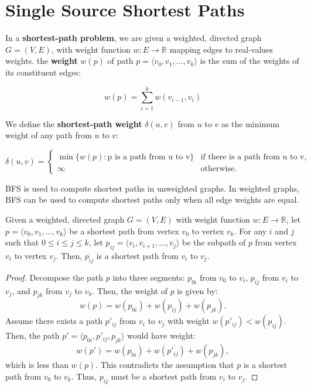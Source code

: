 \newpage

\section{Single Source Shortest Paths}

In a \textbf{shortest-path problem}, we are given a weighted, directed graph $G = (V, E)$, with weight function $w : E \to \mathbb{R}$ mapping edges to 
real-values weights. the \textbf{weight} $w(p)$ of path $p = \langle v_0,v_1,\dots,v_k \rangle$ is the sum of the weights of its constituent edges:

$$
    w(p) = \sum_{i=1}^{k} w(v_{i-1}, v_i)
$$

We define the \textbf{shortest-path weight} $\delta(u,v)$ from $u$ to $v$ as the minimum weight of any path from $u$ to $v$:

$$
    \delta(u,v) = 
    \begin{cases}
        \min \{ w(p) : \text{p is a path from u to v} \} & \text{if there is a path from u to v}, \\
        \infty & \text{otherwise}.
    \end{cases}
$$

\begin{warningblock}[BFS]
BFS is used to compute shortest paths in unweighted graphs. In weighted graphs, BFS can be used to compute shortest paths only when all edge weights are equal.
\end{warningblock}

\newtheorem{subpaths}{Lemma}
\begin{theorem}
    Given a weighted, directed graph $G = (V, E)$ with weight function $w : E \to \mathbb{R}$, let $p = \langle v_0, v_1, \dots, v_k \rangle$ be a shortest path from vertex $v_0$ to vertex $v_k$. For any $i$ and $j$ such that $0 \leq i \leq j \leq k$, let $p_{ij} = \langle v_i, v_{i+1}, \dots, v_j \rangle$ be the subpath of $p$ from vertex $v_i$ to vertex $v_j$. Then, $p_{ij}$ is a shortest path from $v_i$ to $v_j$.
\end{theorem}
\begin{proof}
    Decompose the path $p$ into three segments: $p_{0i}$ from $v_0$ to $v_i$, $p_{ij}$ from $v_i$ to $v_j$, and $p_{jk}$ from $v_j$ to $v_k$. Then, the weight of $p$ is given by:
    $$
    w(p) = w(p_{0i}) + w(p_{ij}) + w(p_{jk}).
    $$
    Assume there exists a path $p'_{ij}$ from $v_i$ to $v_j$ with weight $w(p'_{ij}) < w(p_{ij})$. Then, the path $p' = \langle p_{0i}, p'_{ij}, p_{jk} \rangle$ would have weight:
    $$
    w(p') = w(p_{0i}) + w(p'_{ij}) + w(p_{jk}),
    $$
    which is less than $w(p)$. This contradicts the assumption that $p$ is a shortest path from $v_0$ to $v_k$. Thus, $p_{ij}$ must be a shortest path from $v_i$ to $v_j$. 
\end{proof}

